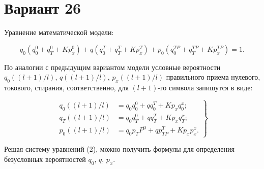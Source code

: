 \documentclass{article}
\begin{document}
\section*{Вариант 26}

Уравнение математической модели:

 \begin{equation}
    q_0 \left( q_0^0 + q_T^0 + K p_x^0 \right) + 
    q \left( q_0^T + q_T^T + K p_x^T \right) + 
    p_0 \left( q_0^{TP} + q_T^{TP} + K p_x^{TP} \right) = 1.
 \end{equation}

По аналогии с предыдущим вариантом модели условные вероятности 
$q_0((l+1)/l)$, $q((l+1)/l)$, $p_x((l+1)/l)$ правильного приема нулевого, 
токового, стирания, соответственно, для $(l+1)$-го символа запишутся в виде:

\begin{equation}
    \left.
    \begin{aligned}
        q_0((l+1)/l) &= q_0 q_0^0 + q q_0^T + K p_x q_0^x; \\
        q_T((l+1)/l) &= q_0 q_T^0 + q q_T^T + K p_x q_T^x; \\
        p_0((l+1)/l) &= q_0 p_TP^0 + q p_{TP}^T + K p_x p_x^x.
    \end{aligned}
    \right\}
\end{equation}

Решая систему уравнений (2), можно получить формулы для определения безусловных вероятностей $q_0$, $q$, $p_x$.
\end{document}
